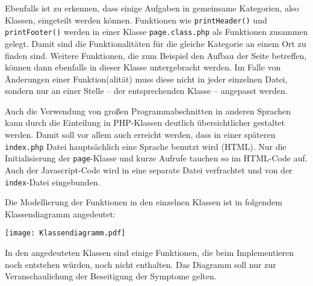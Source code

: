 \documentclass{scrartcl}
\begin{document}
Ebenfalls ist zu erkennen, dass einige Aufgaben in gemeinsame Kategorien, also Klassen, eingeteilt werden können. Funktionen wie \lstinline`printHeader()` und \lstinline`printFooter()` werden in einer Klasse \lstinline`page.class.php` als Funktionen zusammen gelegt. Damit sind die Funktionalitäten für die gleiche Kategorie an einem Ort zu finden sind. Weitere Funktionen, die zum Beispiel den Aufbau der Seite betreffen, können dann ebenfalls in dieser Klasse untergebracht werden. Im Falle von Änderungen einer Funktion(alität) muss diese nicht in jeder einzelnen Datei, sondern nur an einer Stelle -- der entsprechenden Klasse -- angepasst werden.

Auch die Verwendung von großen Programmabschnitten in anderen Sprachen kann durch die Einteilung in PHP-Klassen deutlich übersichtlicher gestaltet werden. Damit soll vor allem auch erreicht werden, dass in einer späteren \lstinline`index.php` Datei hauptsächlich eine Sprache benutzt wird (HTML). Nur die Initialisierung der \lstinline`page`-Klasse und kurze Aufrufe tauchen so im HTML-Code auf. Auch der Javascript-Code wird in eine separate Datei verfrachtet und von der \lstinline`index`-Datei eingebunden.

Die Modellierung der Funktionen in den einzelnen Klassen ist in folgendem Klassendiagramm angedeutet:
\begin{center}
\texttt{[image: Klassendiagramm.pdf]}
\end{center}
In den angedeuteten Klassen sind einige Funktionen, die beim Implementieren noch entstehen würden, noch nicht enthalten. Das Diagramm soll nur zur Veranschaulichung der Beseitigung der Symptome gelten.\bigskip
\end{document}
